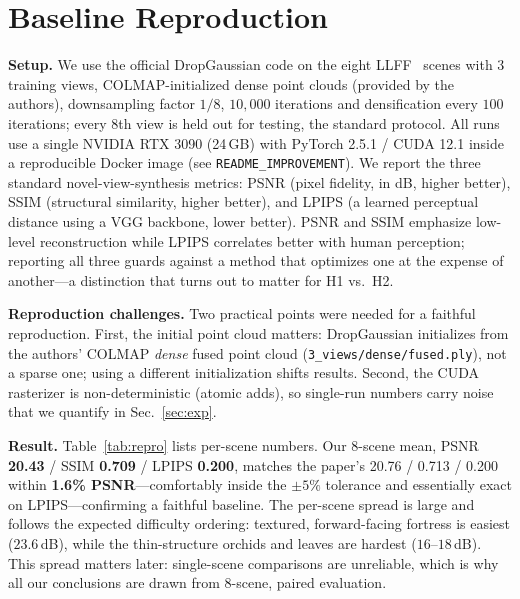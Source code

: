 \documentclass[conference]{IEEEtran}
\begin{document}
\section{Baseline Reproduction}
\label{sec:baseline}
\textbf{Setup.} We use the official DropGaussian code on the eight LLFF~\cite{mildenhall2019llff}
scenes with $3$ training views, COLMAP-initialized dense point clouds (provided by the
authors), downsampling factor $1/8$, $10{,}000$ iterations and densification every
$100$ iterations; every $8$th view is held out for testing, the standard protocol. All
runs use a single NVIDIA RTX 3090 (24\,GB) with PyTorch 2.5.1 / CUDA 12.1 inside a
reproducible Docker image (see \texttt{README\_IMPROVEMENT}). We report the three standard
novel-view-synthesis metrics: PSNR (pixel fidelity, in dB, higher better), SSIM
(structural similarity, higher better), and LPIPS (a learned perceptual distance using a
VGG backbone, lower better). PSNR and SSIM emphasize low-level reconstruction while
LPIPS correlates better with human perception; reporting all three guards against a
method that optimizes one at the expense of another---a distinction that turns out to
matter for H1 vs.\ H2.

\textbf{Reproduction challenges.} Two practical points were needed for a faithful
reproduction. First, the initial point cloud matters: DropGaussian initializes from the
authors' COLMAP \emph{dense} fused point cloud (\texttt{3\_views/dense/fused.ply}), not
a sparse one; using a different initialization shifts results. Second, the CUDA
rasterizer is non-deterministic (atomic adds), so single-run numbers carry noise that
we quantify in Sec.~\ref{sec:exp}.

\textbf{Result.} Table~\ref{tab:repro} lists per-scene numbers. Our 8-scene mean, PSNR
\textbf{20.43} / SSIM \textbf{0.709} / LPIPS \textbf{0.200}, matches the paper's
20.76 / 0.713 / 0.200 within \textbf{1.6\% PSNR}---comfortably inside the $\pm5\%$
tolerance and essentially exact on LPIPS---confirming a faithful baseline. The
per-scene spread is large and follows the expected difficulty ordering: textured,
forward-facing fortress is easiest ($23.6$\,dB), while the thin-structure orchids and
leaves are hardest ($16$--$18$\,dB). This spread matters later: single-scene
comparisons are unreliable, which is why all our conclusions are drawn from 8-scene,
paired evaluation.
\end{document}
